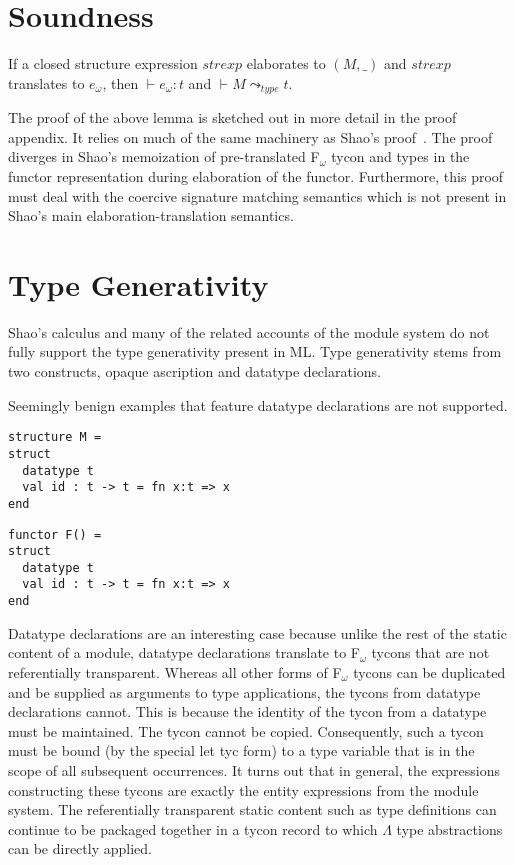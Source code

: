 \section{Soundness}

\begin{theorem}
If a closed structure expression $strexp$ elaborates to $(M, \_)$ and $strexp$
translates to $e_\omega$, then $\vdash e_\omega : t$ and $\vdash M \leadsto_{type} t$. 
\end{theorem}

The proof of the above lemma is sketched out in more detail in the
proof appendix. It relies on much of the same machinery as Shao's
proof~\cite{shao98}. The proof diverges in Shao's memoization of
pre-translated F$_\omega$ tycon and types in the functor
representation during elaboration of the functor. Furthermore, this
proof must deal with the coercive signature matching semantics which
is not present in Shao's main elaboration-translation semantics. 

\section{Type Generativity}

Shao's calculus and many of the related accounts of the module system
do not fully support the type generativity present in ML. Type
generativity stems from two constructs, opaque ascription and datatype
declarations. 

Seemingly benign examples that feature datatype declarations are not supported. 

\begin{lstlisting}
structure M = 
struct 
  datatype t
  val id : t -> t = fn x:t => x
end
\end{lstlisting}

\begin{lstlisting}
functor F() = 
struct
  datatype t
  val id : t -> t = fn x:t => x
end
\end{lstlisting}

Datatype declarations are an interesting case because unlike the rest
of the static content of a module, datatype declarations translate to
F$_\omega$ tycons that are not referentially transparent. Whereas all
other forms of F$_\omega$ tycons can be duplicated and be supplied as
arguments to type applications, the tycons from datatype declarations
cannot. This is because the identity of the tycon from a datatype must
be maintained. The tycon cannot be copied. Consequently, such a tycon
must be bound (by the special let tyc form) to a type variable that is
in the scope of all subsequent occurrences. It turns out that in
general, the expressions constructing these tycons are exactly the
entity expressions from the module system. The referentially
transparent static content such as type definitions can continue to be packaged together in a tycon record to which $\Lambda$ type abstractions can
be directly applied. 

